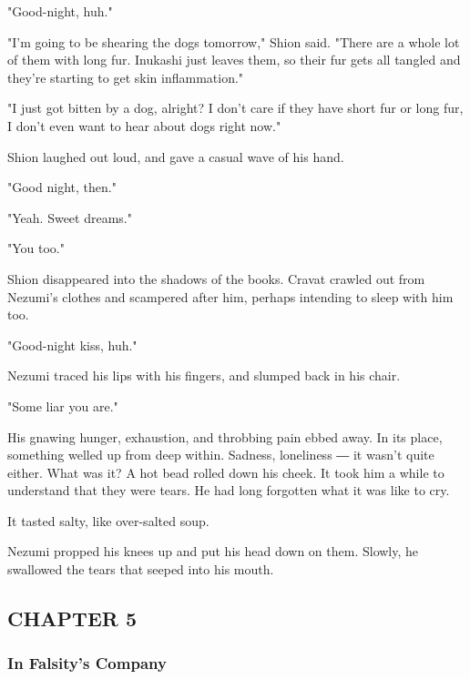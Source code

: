 "Good-night, huh."

"I'm going to be shearing the dogs tomorrow," Shion said. "There are a
whole lot of them with long fur. Inukashi just leaves them, so their fur
gets all tangled and they're starting to get skin inflammation."

"I just got bitten by a dog, alright? I don't care if they have short
fur or long fur, I don't even want to hear about dogs right now."

Shion laughed out loud, and gave a casual wave of his hand.

"Good night, then."

"Yeah. Sweet dreams."

"You too."

Shion disappeared into the shadows of the books. Cravat crawled out from
Nezumi's clothes and scampered after him, perhaps intending to sleep
with him too.

"Good-night kiss, huh."

Nezumi traced his lips with his fingers, and slumped back in his chair.

"Some liar you are."

His gnawing hunger, exhaustion, and throbbing pain ebbed away. In its
place, something welled up from deep within. Sadness, loneliness ― it
wasn't quite either. What was it? A hot bead rolled down his cheek. It
took him a while to understand that they were tears. He had long
forgotten what it was like to cry.

It tasted salty, like over-salted soup.

Nezumi propped his knees up and put his head down on them. Slowly, he
swallowed the tears that seeped into his mouth.

\hypertarget{index_split_088.htmlux5cux23calibre_pb_111}{}

\protect\hypertarget{index_split_108.html}{}{}

\hypertarget{index_split_108.htmlux5cux23calibre_pb_0}{}

\hypertarget{index_split_108.htmlux5cux23calibre_toc_6}{%
\subsection{CHAPTER 5}\label{index_split_108.htmlux5cux23calibre_toc_6}}

\subsubsection{In Falsity's Company}

